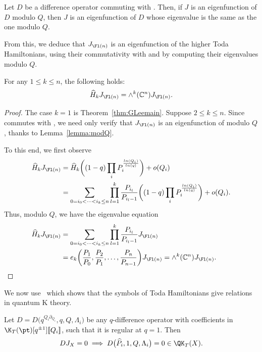 \begin{Lemma}\label{lemma:modQ}
Let $D$ be a difference operator commuting with . Then, if $J$ is an eigenfunction of $D$ modulo $Q$, then $J$ is an eigenfunction of $D$ whose eigenvalue is the same as the one modulo $Q$.
\end{Lemma}

From this, we deduce that $J_{\Fl(n)}$ is an eigenfunction of the higher Toda Hamiltonians, using their commutativity with  and by computing their eigenvalues modulo $Q$.

\begin{Corollary}\label{cor:Hk-eigenval} For any $1 \le k \le n$, the following holds:
\[ \widehat{H}_kJ_{\Fl(n)}=\wedge^k(\mathbb{C}^n) J_{\Fl(n)} . \]
\end{Corollary}
\begin{proof} The case $k=1$ is Theorem~\ref{thm:GLeemain}. Suppose $2 \le k \le n$. Since  commutes with , we need only verify that $J_{\Fl(n)}$ is an eigenfunction of  modulo $Q$, thanks to Lemma~\ref{lemma:modQ}.

To this end, we first observe
\begin{align*}
\widehat{H}_k J_{\Fl(n)}&{}=\widehat{H}_k\biggl((1-q)\prod_i P_i^{\frac{ln(Q_i)}{ln(q)}}\biggr) + o(Q_i) \\
&{}=
\sum_{0= i_0<\dots<i_k\leq n}\prod_{l=1}^k \frac{P_{i_l}}{P_{i_l-1}}\biggl((1-q)\prod_i P_i^{\frac{ln(Q_i)}{ln(q)}}\biggr)+o(Q_i) .
\end{align*}
Thus, modulo $Q$, we have the eigenvalue equation
\begin{align*}
\widehat{H}_k J_{\Fl(n)}&{}=\sum_{0= i_0<\dots<i_k\leq n}
\prod_{l=1}^k \frac{P_{i_l}}{P_{i_l-1}}J_{\Fl(n)}\\
&{}=
e_k\biggl(\frac{P_1}{P_0},\frac{P_2}{P_1},\dots,\frac{P_{n}}{P_{n-1}}\biggr)J_{\Fl(n)}=\wedge^k(\mathbb{C}^n)J_{\Fl(n)} .
\tag*{\qed}
\end{align*}
\renewcommand{\qed}{}
\end{proof}

We now use~\cite[Proposition~2.12]{Iritani:2013qka} which shows that the symbols of
Toda Hamiltonians give relations in quantum K theory.

\begin{Theorem}\label{thm:IMT}
Let $D=D\bigl(q^{Q_i\partial_{Q_i}},q,Q,\Lambda_i\bigr)$ be any $q$-difference operator
with coefficients in $\K_T(\pt)[q^{\pm 1}][\![Q_i]\!]$, such that it is regular
at $q=1$. Then
\[DJ_X=0\implies D\bigl(\widehat{P}_i,1,Q,\Lambda_i\bigr)=0 \in \QK_T(X) .\]
\end{Theorem}

